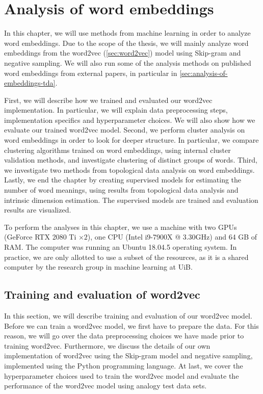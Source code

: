 \chapter{Analysis of word embeddings}
In this chapter, we will use methods from machine learning in order to analyze word embeddings. Due to the scope of the thesis, we will mainly analyze word embeddings from the word2vec (\cref{sec:word2vec}) model using Skip-gram and negative sampling. We will also run some of the analysis methods on published word embeddings from external papers, in particular in \cref{sec:analysis-of-embeddings-tda}.

First, we will describe how we trained and evaluated our word2vec implementation. In particular, we will explain data preprocessing steps, implementation specifics and hyperparameter choices. We will also show how we evaluate our trained word2vec model. Second, we perform cluster analysis on word embeddings in order to look for deeper structure. In particular, we compare clustering algorithms trained on word embeddings, using internal cluster validation methods, and investigate clustering of distinct groups of words. Third, we investigate two methods from topological data analysis on word embeddings. Lastly, we end the chapter by creating supervised models for estimating the number of word meanings, using results from topological data analysis and intrinsic dimension estimation. The supervised models are trained and evaluation results are visualized.

To perform the analyses in this chapter, we use a machine with two GPUs (GeForce RTX 2080 Ti $\times2$), one CPU (Intel i9-7900X @ 3.30GHz) and 64 GB of RAM. The computer was running an Ubuntu 18.04.5 operating system. In practice, we are only allotted to use a subset of the resources, as it is a shared computer by the research group in machine learning at UiB.

\section{Training and evaluation of word2vec}
\label{sec:training-and-eval-our-word2vec-impl}
In this section, we will describe training and evaluation of our word2vec model. Before we can train a word2vec model, we first have to prepare the data. For this reason, we will go over the data preprocessing choices we have made prior to training word2vec. Furthermore, we discuss the details of our own implementation of word2vec using the Skip-gram model and negative sampling, implemented using the Python programming language. At last, we cover the hyperparameter choices used to train the word2vec model and evaluate the performance of the word2vec model using analogy test data sets.

